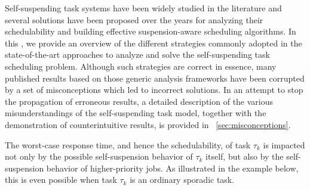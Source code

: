 
\label{sec:review}

Self-suspending task systems have been widely studied in the literature and several solutions have been proposed over the years for 
analyzing their schedulability and building effective suspension-aware scheduling algorithms. In this \mysectionrefnormal{}, we provide an overview of the different 
strategies commonly adopted in the state-of-the-art approaches to analyze and solve the self-suspending task scheduling problem. Although such strategies are
correct in essence, many published results based on those generic analysis frameworks have been corrupted by a set of 
misconceptions which led to incorrect solutions. In an attempt to stop the propagation of erroneous results, a detailed 
description of the various misunderstandings of the self-suspending task model, together with the demonstration of 
counterintuitive results, is provided in \mysectionref{}~\ref{sec:misconceptions}.

The worst-case response time, and hence the schedulability, of task $\tau_k$ is impacted not only by 
the possible self-suspension behavior of $\tau_k$ itself, but also by
the self-suspension behavior of  higher-priority jobs. As illustrated
in the example below, this is even possible when task $\tau_k$ is an
ordinary sporadic task.


